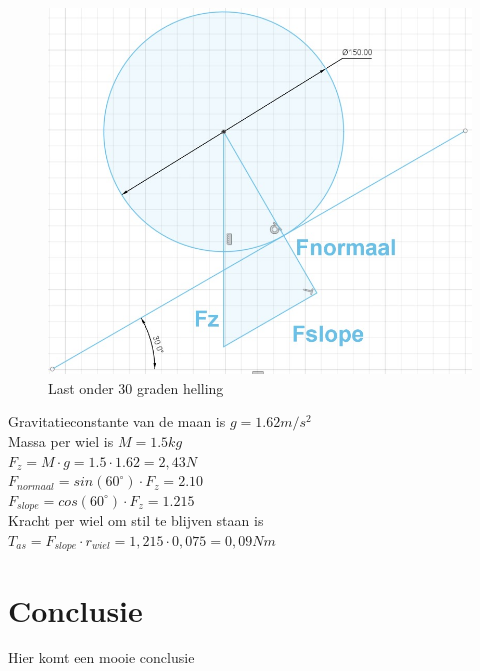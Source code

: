 \documentclass{article}
\begin{document}
\begin{figure}[h]
  \centering
  \includegraphics[scale=0.3]{last_helling.jpg}
  \caption{Last onder 30 graden helling}
\end{figure}
Gravitatieconstante van de maan is $g = 1.62 m/s^{2}$ \cite{HemelWaarnemen}\\
Massa per wiel is $M = 1.5 kg$ \\
$F_{z} = M \cdot g = 1.5 \cdot 1.62 = 2,43N$\\
$F_{normaal} = sin(60^\circ) \cdot F_{z} = 2.10$\\
$F_{slope} = cos(60^\circ) \cdot F_{z} = 1.215$\\
Kracht per wiel om stil te blijven staan is $T_{as} = F_{slope} \cdot r_{wiel} = 1,215 \cdot 0,075 = 0,09Nm$




\section*{Conclusie}
Hier komt een mooie conclusie

% 
% 



\end{document}
